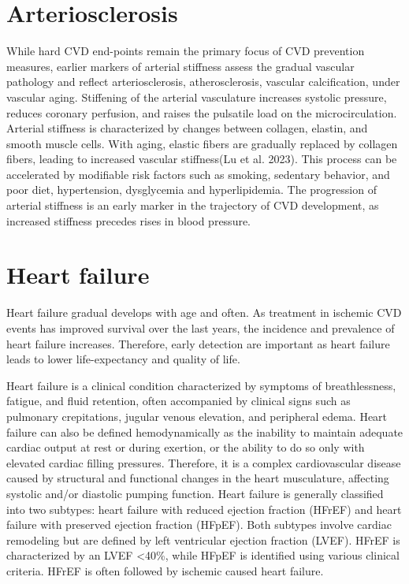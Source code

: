 \documentclass[
  a4paper,
  headsepline=true,
  open=any]{scrbook}
\begin{document}

\hypertarget{arteriosclerosis}{%
\chapter{Arteriosclerosis}\label{arteriosclerosis}}

While hard CVD end-points remain the primary focus of CVD prevention
measures, earlier markers of arterial stiffness assess the gradual
vascular pathology and reflect arteriosclerosis, atherosclerosis,
vascular calcification, under vascular aging. Stiffening of the arterial
vasculature increases systolic pressure, reduces coronary perfusion, and
raises the pulsatile load on the microcirculation. Arterial stiffness is
characterized by changes between collagen, elastin, and smooth muscle
cells. With aging, elastic fibers are gradually replaced by collagen
fibers, leading to increased vascular stiffness(Lu et al. 2023). This
process can be accelerated by modifiable risk factors such as smoking,
sedentary behavior, and poor diet, hypertension, dysglycemia and
hyperlipidemia. The progression of arterial stiffness is an early marker
in the trajectory of CVD development, as increased stiffness precedes
rises in blood pressure.


\hypertarget{heart-failure}{%
\chapter{Heart failure}\label{heart-failure}}

Heart failure gradual develops with age and often. As treatment in
ischemic CVD events has improved survival over the last years, the
incidence and prevalence of heart failure increases. Therefore, early
detection are important as heart failure leads to lower life-expectancy
and quality of life.

Heart failure is a clinical condition characterized by symptoms of
breathlessness, fatigue, and fluid retention, often accompanied by
clinical signs such as pulmonary crepitations, jugular venous elevation,
and peripheral edema. Heart failure can also be defined hemodynamically
as the inability to maintain adequate cardiac output at rest or during
exertion, or the ability to do so only with elevated cardiac filling
pressures. Therefore, it is a complex cardiovascular disease caused by
structural and functional changes in the heart musculature, affecting
systolic and/or diastolic pumping function. Heart failure is generally
classified into two subtypes: heart failure with reduced ejection
fraction (HFrEF) and heart failure with preserved ejection fraction
(HFpEF). Both subtypes involve cardiac remodeling but are defined by
left ventricular ejection fraction (LVEF). HFrEF is characterized by an
LVEF \textless40\%, while HFpEF is identified using various clinical
criteria. HFrEF is often followed by ischemic caused heart failure.
\end{document}
